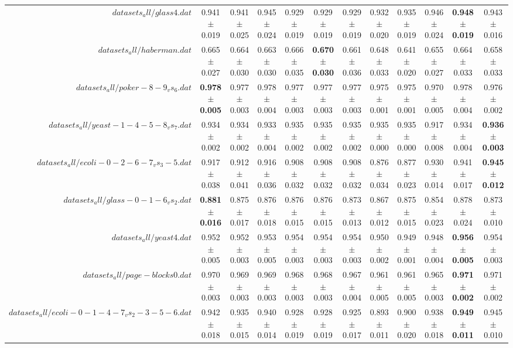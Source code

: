 \begin{table}[!ht]
{\begin{tabular}{r c c c c c c c c c c c}
$datasets_all/glass4.dat$ & 0.941 $\pm$ 0.019 & 0.941 $\pm$ 0.025 & 0.945 $\pm$ 0.024 & 0.929 $\pm$ 0.019 & 0.929 $\pm$ 0.019 & 0.929 $\pm$ 0.019 & 0.932 $\pm$ 0.020 & 0.935 $\pm$ 0.019 & 0.946 $\pm$ 0.024 & \textbf{0.948 $\pm$ 0.019} & 0.943 $\pm$ 0.016 \\
$datasets_all/haberman.dat$ & 0.665 $\pm$ 0.027 & 0.664 $\pm$ 0.030 & 0.663 $\pm$ 0.030 & 0.666 $\pm$ 0.035 & \textbf{0.670 $\pm$ 0.030} & 0.661 $\pm$ 0.036 & 0.648 $\pm$ 0.033 & 0.641 $\pm$ 0.020 & 0.655 $\pm$ 0.027 & 0.664 $\pm$ 0.033 & 0.658 $\pm$ 0.033 \\
$datasets_all/poker-8-9_vs_6.dat$ & \textbf{0.978 $\pm$ 0.005} & 0.977 $\pm$ 0.003 & 0.978 $\pm$ 0.004 & 0.977 $\pm$ 0.003 & 0.977 $\pm$ 0.003 & 0.977 $\pm$ 0.003 & 0.975 $\pm$ 0.001 & 0.975 $\pm$ 0.001 & 0.970 $\pm$ 0.005 & 0.978 $\pm$ 0.004 & 0.976 $\pm$ 0.002 \\
$datasets_all/yeast-1-4-5-8_vs_7.dat$ & 0.934 $\pm$ 0.002 & 0.934 $\pm$ 0.002 & 0.933 $\pm$ 0.004 & 0.935 $\pm$ 0.002 & 0.935 $\pm$ 0.002 & 0.935 $\pm$ 0.002 & 0.935 $\pm$ 0.000 & 0.935 $\pm$ 0.000 & 0.917 $\pm$ 0.008 & 0.934 $\pm$ 0.004 & \textbf{0.936 $\pm$ 0.003} \\
$datasets_all/ecoli-0-2-6-7_vs_3-5.dat$ & 0.917 $\pm$ 0.038 & 0.912 $\pm$ 0.041 & 0.916 $\pm$ 0.036 & 0.908 $\pm$ 0.032 & 0.908 $\pm$ 0.032 & 0.908 $\pm$ 0.032 & 0.876 $\pm$ 0.034 & 0.877 $\pm$ 0.023 & 0.930 $\pm$ 0.014 & 0.941 $\pm$ 0.017 & \textbf{0.945 $\pm$ 0.012} \\
$datasets_all/glass-0-1-6_vs_2.dat$ & \textbf{0.881 $\pm$ 0.016} & 0.875 $\pm$ 0.017 & 0.876 $\pm$ 0.018 & 0.876 $\pm$ 0.015 & 0.876 $\pm$ 0.015 & 0.873 $\pm$ 0.013 & 0.867 $\pm$ 0.012 & 0.875 $\pm$ 0.015 & 0.854 $\pm$ 0.023 & 0.878 $\pm$ 0.024 & 0.873 $\pm$ 0.010 \\
$datasets_all/yeast4.dat$ & 0.952 $\pm$ 0.005 & 0.952 $\pm$ 0.003 & 0.953 $\pm$ 0.005 & 0.954 $\pm$ 0.003 & 0.954 $\pm$ 0.003 & 0.954 $\pm$ 0.003 & 0.950 $\pm$ 0.002 & 0.949 $\pm$ 0.001 & 0.948 $\pm$ 0.004 & \textbf{0.956 $\pm$ 0.005} & 0.954 $\pm$ 0.003 \\
$datasets_all/page-blocks0.dat$ & 0.970 $\pm$ 0.003 & 0.969 $\pm$ 0.003 & 0.969 $\pm$ 0.003 & 0.968 $\pm$ 0.003 & 0.968 $\pm$ 0.003 & 0.967 $\pm$ 0.004 & 0.961 $\pm$ 0.005 & 0.961 $\pm$ 0.005 & 0.965 $\pm$ 0.003 & \textbf{0.971 $\pm$ 0.002} & 0.971 $\pm$ 0.002 \\
$datasets_all/ecoli-0-1-4-7_vs_2-3-5-6.dat$ & 0.942 $\pm$ 0.018 & 0.935 $\pm$ 0.015 & 0.940 $\pm$ 0.014 & 0.928 $\pm$ 0.019 & 0.928 $\pm$ 0.019 & 0.925 $\pm$ 0.017 & 0.893 $\pm$ 0.011 & 0.900 $\pm$ 0.020 & 0.938 $\pm$ 0.018 & \textbf{0.949 $\pm$ 0.011} & 0.945 $\pm$ 0.010 \\

\end{tabular}}
\end{table}
